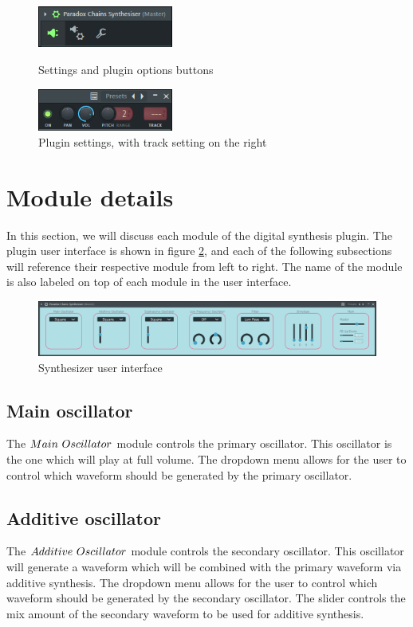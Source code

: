 \documentclass[a4paper,12pt]{report}
\begin{document}
\begin{figure}[h]
    \centering
    \includegraphics[width=12em]{PluginSettings1.png}
    \caption{Settings and plugin options buttons}
    \label{fig:PluginSettings1}
    \includegraphics[width=12em]{PluginSettings2.png}
    \caption{Plugin settings, with track setting on the right}
    \label{fig:PluginSettings2}
\end{figure}

\section{Module details}
\label{sec:moduledetails}
In this section, we will discuss each module of the digital synthesis plugin. The plugin user interface is shown in figure \ref{fig:OverallScreenshot}, and each of the following subsections will reference their respective module from left to right. The name of the module is also labeled on top of each module in the user interface.

\begin{figure}
    \centering
    \includegraphics[width=36em]{OverallScreenshot.png}
    \caption{Synthesizer user interface}
    \label{fig:OverallScreenshot}
\end{figure}

\subsection{Main oscillator}
\label{subsec:mainosc}
The $Main\ \-Oscillator$ module controls the primary oscillator. This oscillator is the one which will play at full volume. The dropdown menu allows for the user to control which waveform should be generated by the primary oscillator.


\subsection{Additive oscillator}
\label{subsec:addosc}
The $Additive\ \-Oscillator$ module controls the secondary oscillator. This oscillator will generate a waveform which will be combined with the primary waveform via additive synthesis. The dropdown menu allows for the user to control which waveform should be generated by the secondary oscillator. The slider controls the mix amount of the secondary waveform to be used for additive synthesis.
\end{document}
